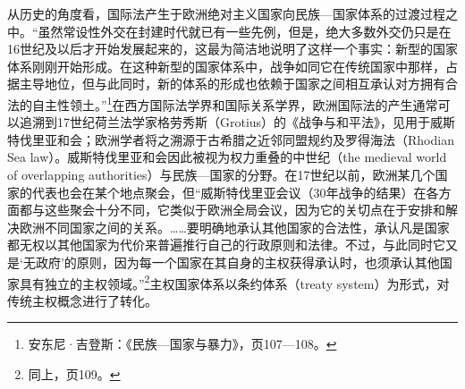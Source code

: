 \documentclass[a4paper, 12pt, openright]{ctexbook}
\begin{document}
从历史的角度看，国际法产生于欧洲绝对主义国家向民族—国家体系的过渡过程之中。“虽然常设性外交在封建时代就已有一些先例，但是，绝大多数外交仍只是在16世纪及以后才开始发展起来的，这最为简洁地说明了这样一个事实：新型的国家体系刚刚开始形成。在这种新型的国家体系中，战争如同它在传统国家中那样，占据主导地位，但与此同时，新的体系的形成也依赖于国家之间相互承认对方拥有合法的自主性领土。”\footnote{安东尼·吉登斯：《民族—国家与暴力》，页107—108。}在西方国际法学界和国际关系学界，欧洲国际法的产生通常可以追溯到17世纪荷兰法学家格劳秀斯（Grotius）的《战争与和平法》，见用于威斯特伐里亚和会；欧洲学者将之溯源于古希腊之近邻同盟规约及罗得海法（Rhodian Sea law）。威斯特伐里亚和会因此被视为权力重叠的中世纪（the medieval world of overlapping authorities）与民族—国家的分野。在17世纪以前，欧洲某几个国家的代表也会在某个地点聚会，但“威斯特伐里亚会议（30年战争的结果）在各方面都与这些聚会十分不同，它类似于欧洲全局会议，因为它的关切点在于安排和解决欧洲不同国家之间的关系。……要明确地承认其他国家的合法性，承认凡是国家都无权以其他国家为代价来普遍推行自己的行政原则和法律。不过，与此同时它又是‘无政府’的原则，因为每一个国家在其自身的主权获得承认时，也须承认其他国家具有独立的主权领域。”\footnote{同上，页109。}主权国家体系以条约体系（treaty system）为形式，对传统主权概念进行了转化。
\end{document}
